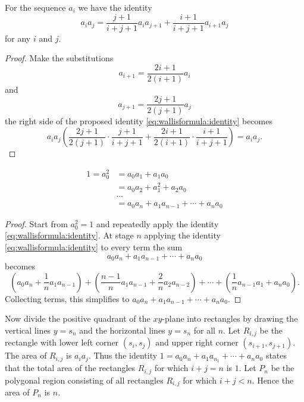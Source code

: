 \documentclass[12pt]{article}
\begin{document}
\begin{lemma}
    For the sequence \( a_i \) we have the identity
    \begin{equation}
        \label{eq:wallisformula:identity} a_i a_j = \frac{j+1}{i+j+1} a_i
        a_{j+1} + \frac{i+1}{i+j+1} a_{i+1} a_{j}
    \end{equation}
    for any \( i \) and \( j \).
\end{lemma}

\begin{proof}
    Make the substitutions
    \[
        a_{i+1} = \frac{2i +1}{2(i+1)} a_i
    \] and
    \[
        a_{j+1} = \frac{2j +1}{2(j+1)} a_j
    \] the right side of the proposed identity \eqref{eq:wallisformula:identity}
    becomes
    \[
        a_i a_j \left( \frac{2j+1}{2(j+1)} \cdot \frac{j+1}{i+j+1} +
        \frac{2i+1}{2(i+1)} \cdot \frac{i+1}{i+j+1}\right) = a_i a_j.
    \]
\end{proof}

\begin{lemma}
    \begin{align*}
        1 = a_0^2 &= a_0 a_1 + a_1 a_0 \\
        &= a_0 a_2 + a_1^2 + a_2 a_0 \\
        & \ldots \\
        &= a_0 a_n + a_1 a_{n-1} + \cdots + a_n a_0
    \end{align*}
\end{lemma}

\begin{proof}
    Start from \( a_0^2 = 1 \) and repeatedly apply the identity \eqref{eq:wallisformula:identity}.
    At stage \( n \) applying the identity \eqref{eq:wallisformula:identity}
    to every term the sum
    \[
        a_0 a_n + a_1 a_{n-1} + \cdots + a_n a_0
    \] becomes
    \[
        \left( a_0 a_n + \frac{1}{n}a_1 a_{n-1}\right) + \left( \frac{n-1}
        {n} a_1 a_{n-1} + \frac{2}{n} a_2 a_{n-2}\right) + \cdots +
        \left( \frac{1}{n} a_{n-1} a_{1} + a_n a_{0} \right).
    \] Collecting terms, this simplifies to \( a_0 a_n + a_1 a_{n-1} +
    \cdots + a_n a_0 \).
\end{proof}

Now divide the positive quadrant of the \( xy \)-plane into rectangles
by drawing the vertical lines \( y = s_n \) and the horizontal lines \(
y = s_n \) for all \( n \).  Let \( R_{i,j} \) be the rectangle with
lower left corner \( ( s_i, s_j) \) and upper right corner \( (s_{i+1},
s_{j+1}) \).  The area of \( R_{i,j} \) is \( a_i a_j \).  Thus the
identity \( 1 = a_0 a_n + a_1 a_{n_1} + \cdots + a_n a_0 \) states that
the total area of the rectangles \( R_{i,j} \) for which \( i + j = n \)
is \( 1 \).  Let \( P_n \) be the polygonal region consisting of all
rectangles \( R_{i,j} \) for which \( i +j < n \).  Hence the area of \(
P_n \) is \( n \).
\end{document}
